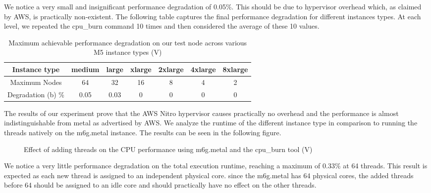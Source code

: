 \noindent
We notice a very small and insignificant performance  degradation of 0.05\%. This should be due 
to hypervisor overhead which, as claimed by AWS, is practically non-existent. 
The following table captures the final performance degradation for different instances types. 
At each level, we repeated the cpu\_burn command 10 times and then considered the average of these 10 values. 
\begin{table}[H]
\begin{center}
\begin{tabular}{ c|c|c|c|c|c|c }
 Instance type & medium & large & xlarge & 2xlarge & 4xlarge  & 8xlarge  \\
 \hline
 Maximum Nodes & 64 & 32 & 16 & 8 & 4 & 2 \\
\hline
Degradation (b) \%& 0.05 & 0.03 & 0 & 0 & 0 & 0  \\
\end{tabular}
\end{center}
\caption{Maximum achievable performance degradation on our test node across various M5 instance types (V)}
\end{table}
\noindent
The results of our experiment prove that the AWS Nitro hypervisor causes practically no overhead and 
the performance is almost indistinguishable from metal as advertised by AWS. We analyze the runtime of 
the different instance type in comparison to running the threads natively on the m6g.metal instance. 
The results can be seen in the following figure. 
\begin{figure}[H]
\centering
{}
\caption{Effect of adding threads on the CPU performance using m6g.metal and the cpu\_burn tool (V) }
\end{figure}
\noindent
We notice a very little performance degradation on the total execution runtime, reaching a maximum 
of 0.33\% at 64 threads. This result is expected as each new thread is assigned to an independent 
physical core. since the m6g.metal has 64 physical cores, the added threads before 64 should be 
assigned to an idle core and should practically have no effect on the other threads.